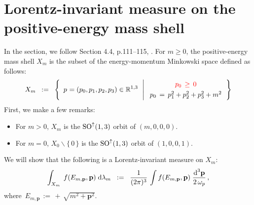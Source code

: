 
\vskip 1.0cm
\section{Lorentz-invariant measure on the positive-energy mass shell}

In the section, we follow Section 4.4, p.111--115, \cite{Talagrand2022}.
For $m \geq 0$, the positive-energy mass shell $X_{m}$ is the subset
of the energy-momentum Minkowski space defined as follows:
\begin{equation*}
X_{m}
\;\; := \;\;
	\left\{\;\,
		\overset{{\color{white}-}}{p} = (p_{0},p_{1},p_{2},p_{3}) \in \Re^{1,3}
		\,\;\left\vert\;
		\begin{array}{c}
			{\color{red}p_{0} \,\geq\, 0}
			\\
			\overset{{\color{white}-}}{p_{0}} \,=\, p_{1}^{2} + p_{2}^{2} + p_{3}^{2} + m^{2}
			\end{array}
		\right.
		\right\}
\end{equation*}
First, we make a few remarks:
\begin{itemize}
\item
	For $m > 0$, $X_{m}$ is the $\textnormal{SO}^{\uparrow}(1,3)$ orbit of $(m,0,0,0)$.
\item
	For $m = 0$, $X_{0} \backslash \{\,0\,\}$ is the $\textnormal{SO}^{\uparrow}(1,3)$ orbit of $(1,0,0,1)$.
\end{itemize}
We will show that the following is a Lorentz-invariant measure on $X_{m}$:
\begin{equation*}
\int_{X_{m}}\; f(E_{m,\mathbf{p}},\mathbf{p})\;\textnormal{d}\lambda_{m}
\;\; := \;\;
	\dfrac{1}{(2\pi)^{3}}\,\int f(E_{m,\mathbf{p}},\mathbf{p}) \; \dfrac{\textnormal{d}^{3}\mathbf{p}}{2\,\omega_{p}}\,,
\end{equation*}
where \,$E_{m,\mathbf{p}} \,:=\, +\,\sqrt{m^{2}+\mathbf{p}^{2}}$.

